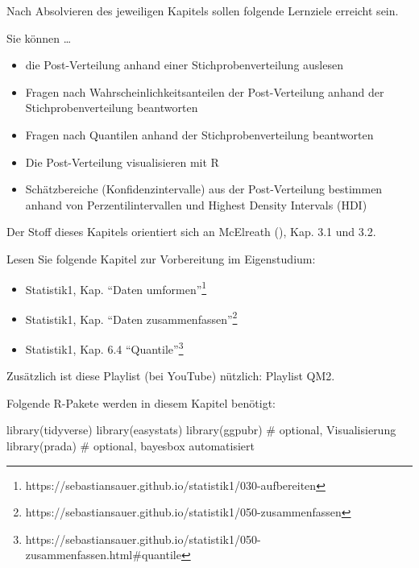 \documentclass[
  ngerman,
  letterpaper,
  twoside,
  open=any]{scrbook}
\newenvironment{Shaded}{\begin{snugshade}}{\end{snugshade}}
\newcommand{\CommentTok}[1]{\textcolor[rgb]{0.37,0.37,0.37}{#1}}
\newcommand{\FunctionTok}[1]{\textcolor[rgb]{0.28,0.35,0.67}{#1}}
\newcommand{\NormalTok}[1]{\textcolor[rgb]{0.00,0.23,0.31}{#1}}
\providecommand{\tightlist}{%
  \setlength{\itemsep}{0pt}\setlength{\parskip}{0pt}}\usepackage{longtable,booktabs,array}
\theoremstyle{definition}
\theoremstyle{plain}
\theoremstyle{definition}
\theoremstyle{definition}
\theoremstyle{definition}
\theoremstyle{definition}
\theoremstyle{remark}
\begin{document}
Nach Absolvieren des jeweiligen Kapitels sollen folgende Lernziele
erreicht sein.

Sie können \ldots{}

\begin{itemize}
\tightlist
\item
  die Post-Verteilung anhand einer Stichprobenverteilung auslesen
\item
  Fragen nach Wahrscheinlichkeitsanteilen der Post-Verteilung anhand der
  Stichprobenverteilung beantworten
\item
  Fragen nach Quantilen anhand der Stichprobenverteilung beantworten
\item
  Die Post-Verteilung visualisieren mit R
\item
  Schätzbereiche (Konfidenzintervalle) aus der Post-Verteilung bestimmen
  anhand von Perzentilintervallen und Highest Density Intervals (HDI)
\end{itemize}

Der Stoff dieses Kapitels orientiert sich an McElreath
(), Kap. 3.1 und 3.2.

Lesen Sie folgende Kapitel zur Vorbereitung im Eigenstudium:

\begin{itemize}
\tightlist
\item
  Statistik1, Kap. \enquote{Daten umformen}\footnote{https://sebastiansauer.github.io/statistik1/030-aufbereiten}
\item
  Statistik1, Kap. \enquote{Daten zusammenfassen}\footnote{https://sebastiansauer.github.io/statistik1/050-zusammenfassen}
\item
  Statistik1, Kap. 6.4 \enquote{Quantile}\footnote{https://sebastiansauer.github.io/statistik1/050-zusammenfassen.html\#quantile}
\end{itemize}

Zusätzlich ist diese Playlist (bei YouTube) nützlich: Playlist QM2.

Folgende R-Pakete werden in diesem Kapitel benötigt:

\begin{Shaded}
\begin{Highlighting}[]
\FunctionTok{library}\NormalTok{(tidyverse)}
\FunctionTok{library}\NormalTok{(easystats)}
\FunctionTok{library}\NormalTok{(ggpubr)  }\CommentTok{\# optional, Visualisierung}
\FunctionTok{library}\NormalTok{(prada)    }\CommentTok{\# optional, bayesbox automatisiert}
\end{Highlighting}
\end{Shaded}
\end{document}
